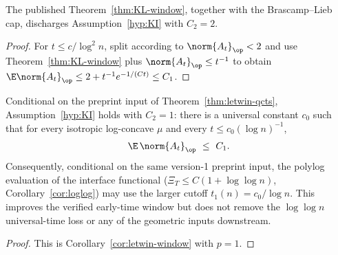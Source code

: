 \documentclass[../../main.tex]{subfiles}
\begin{document}
\begin{corollary}
\label{cor:KI-discharged}
The published Theorem~\ref{thm:KL-window}, together with the Brascamp--Lieb cap, discharges
Assumption~\ref{hyp:KI} with $C_2=2$.
\end{corollary}

\begin{proof}
For $t\le c/\log^2n$, split according to $\norm{A_t}_\op<2$ and use
Theorem~\ref{thm:KL-window} plus $\norm{A_t}_\op\le t^{-1}$ to obtain
$\E\norm{A_t}_\op\le2+t^{-1}e^{-1/(Ct)}\le C_1$.
\end{proof}

\begin{corollary}
\label{cor:KI-letwin}
Conditional on the preprint input of Theorem~\ref{thm:letwin-qcts},
Assumption~\ref{hyp:KI} holds with $C_2=1$: there is a universal constant $c_0$ such
that for every isotropic log-concave $\mu$ and every $t\le c_0(\log n)^{-1}$,
\[
  \E\,\norm{A_t}_\op\ \le\ C_1 .
\]
Consequently, conditional on the same version-1 preprint input, the polylog evaluation of the
interface functional ($\Xi_T\le C(1+\log\log n)$, Corollary~\ref{cor:loglog}) may use the
larger cutoff $t_1(n)=c_0/\log n$.  This improves the verified early-time window but does not
remove the $\log\log n$ universal-time loss or any of the geometric inputs downstream.
\end{corollary}

\begin{proof}
This is Corollary~\ref{cor:letwin-window} with $p=1$.
\end{proof}
\end{document}
